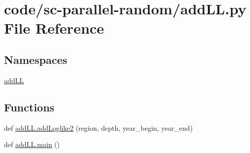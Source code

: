 \hypertarget{code_2sc-parallel-random_2add_l_l_8py}{}\section{code/sc-\/parallel-\/random/add\+LL.py File Reference}
\label{code_2sc-parallel-random_2add_l_l_8py}
\subsection*{Namespaces}
\begin{DoxyCompactItemize}
\item 
 \hyperlink{namespaceadd_l_l}{add\+LL}
\end{DoxyCompactItemize}
\subsection*{Functions}
\begin{DoxyCompactItemize}
\item 
def \hyperlink{namespaceadd_l_l_aa96a722d0234136b34ff4a5e5cd181d0}{add\+L\+L.\+add\+Loglike2} (region, depth, year\+\_\+begin, year\+\_\+end)
\item 
def \hyperlink{namespaceadd_l_l_a81cabc4a4a81cb2c54417df2d6eedb3a}{add\+L\+L.\+main} ()
\end{DoxyCompactItemize}
